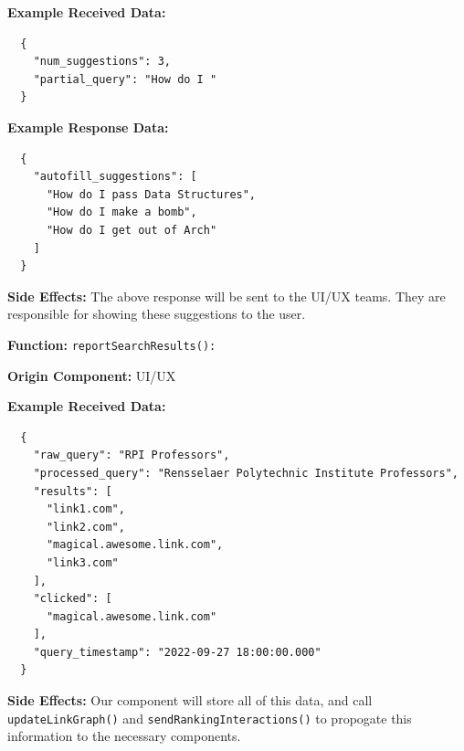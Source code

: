 \textbf{Example Received Data:} \begin{verbatim}
  {
    "num_suggestions": 3,
    "partial_query": "How do I "
  }
\end{verbatim}

\textbf{Example Response Data:} \begin{verbatim}
  {
    "autofill_suggestions": [
      "How do I pass Data Structures",
      "How do I make a bomb",
      "How do I get out of Arch"
    ]
  }
\end{verbatim}

\smallskip

\textbf{Side Effects:} The above response will be sent to the UI/UX teams. They are responsible for showing these suggestions to the user.

\bigskip

\textbf{Function:} \verb|reportSearchResults():|

\smallskip

\textbf{Origin Component:} UI/UX

\smallskip

\textbf{Example Received Data:} \begin{verbatim}
  {
    "raw_query": "RPI Professors",
    "processed_query": "Rensselaer Polytechnic Institute Professors",
    "results": [
      "link1.com",
      "link2.com", 
      "magical.awesome.link.com",
      "link3.com"
    ],
    "clicked": [
      "magical.awesome.link.com"
    ],
    "query_timestamp": "2022-09-27 18:00:00.000"
  }
\end{verbatim}

\smallskip

\textbf{Side Effects:} Our component will store all of this data, and call \verb|updateLinkGraph()| and \verb|sendRankingInteractions()| to propogate this information to the necessary components.